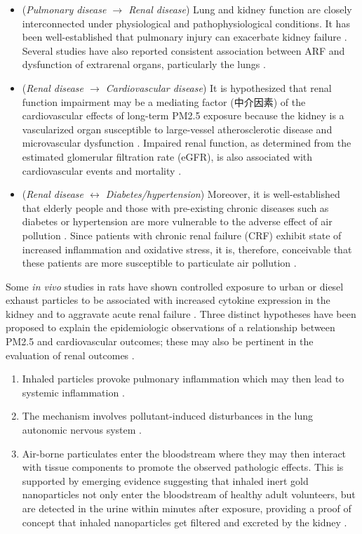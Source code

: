 \documentclass[11pt]{article}
\begin{document}
\begin{itemize}
    \item (\textit{Pulmonary disease $\rightarrow$ Renal disease}) Lung and kidney function are closely interconnected under physiological and pathophysiological conditions. It has been well-established that pulmonary injury can exacerbate kidney failure \citep{pierson2006respiratory}. Several studies have also reported consistent association between ARF and dysfunction of extrarenal organs, particularly the lungs \citep{hoke2007acute, pierson2006respiratory}.
    \item (\textit{Renal disease $\rightarrow$ Cardiovascular disease}) It is hypothesized that renal function impairment may be a mediating factor (中介因素) of the cardiovascular effects of long-term PM2.5 exposure because the kidney is a vascularized organ susceptible to large-vessel atherosclerotic disease and microvascular dysfunction \citep{lue2013residential}. Impaired renal function, as determined from the estimated glomerular filtration rate (eGFR), is also associated with cardiovascular events and mortality \citep{fox2012associations, go2004chronic, sarnak2003kidney}. 
    \item (\textit{Renal disease $\leftrightarrow$ Diabetes/hypertension}) Moreover, it is well-established that elderly people and those with pre-existing chronic diseases such as diabetes or hypertension are more vulnerable to the adverse effect of air pollution \citep{brook2010particulate}. Since patients with chronic renal failure (CRF) exhibit state of increased inflammation and oxidative stress, it is, therefore, conceivable that these patients are more susceptible to particulate air pollution \citep{laden2011air, huang2014impact}.
\end{itemize}

Some \textit{in vivo} studies in rats have shown controlled exposure to urban or diesel exhaust particles to be associated with increased cytokine expression in the kidney \citep{thomson2013mapping} and to aggravate acute renal failure \citep{nemmar2009diesel}. Three distinct hypotheses have been proposed to explain the epidemiologic observations of a relationship between PM2.5 and cardiovascular outcomes; these may also be pertinent in the evaluation of renal outcomes \citep{bowe2018particulate}.
\begin{enumerate}
    \item Inhaled particles provoke pulmonary inflammation which may then lead to systemic inflammation \citep{chin2014basic}.
    \item The mechanism involves pollutant-induced disturbances in the lung autonomic nervous system \citep{chin2014basic}.
    \item Air-borne particulates enter the bloodstream where they may then interact with tissue components to promote the observed pathologic effects. This is supported by emerging evidence suggesting that inhaled inert gold nanoparticles not only enter the bloodstream of healthy adult volunteers, but are detected in the urine within minutes after exposure, providing a proof of concept that inhaled nanoparticles get filtered and excreted by the kidney \citep{chin2014basic, miller2017inhaled}.
\end{enumerate}
\end{document}
